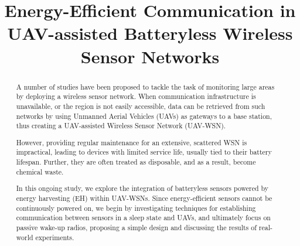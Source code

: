 \documentclass[conference]{IEEEtran}
\begin{document}
\title{Energy-Efficient Communication in UAV-assisted Batteryless Wireless Sensor Networks}

\author{
  \and
  \and
  \and
}

\maketitle

\begin{abstract}
  A number of studies have been proposed to tackle the task of monitoring large areas by deploying a wireless sensor network. When communication infrastructure is unavailable, or the region is not easily accessible, data can be retrieved from such networks by using Unmanned Aerial Vehicles (UAVs) as gateways to a base station, thus creating a UAV-assisted Wireless Sensor Network (UAV-WSN).

  However, providing regular maintenance for an extensive, scattered WSN is impractical, leading to devices with limited service life, usually tied to their battery lifespan. Further, they are often treated as disposable, and as a result, become chemical waste.

  In this ongoing study, we explore the integration of batteryless sensors powered by energy harvesting (EH) within UAV-WSNs. Since energy-efficient sensors cannot be continuously powered on, we begin by investigating techniques for establishing communication between sensors in a sleep state and UAVs, and ultimately focus on passive wake-up radios, proposing a simple design and discussing the results of real-world experiments.
\end{abstract}
\end{document}
